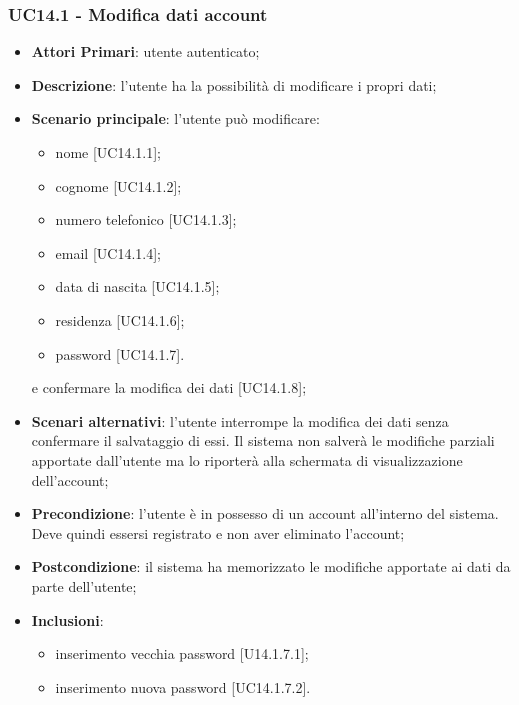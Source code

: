 \subsubsection{UC14.1 - Modifica dati account}
\begin{itemize}
	\item \textbf{Attori Primari}: utente autenticato;
	\item \textbf{Descrizione}: l'utente ha la possibilità di modificare i propri dati;
	\item \textbf{Scenario principale}: l'utente può modificare:
	\begin{itemize}
		\item nome [UC14.1.1];
		\item cognome [UC14.1.2];
		\item numero telefonico [UC14.1.3];
		\item email [UC14.1.4];
		\item data di nascita [UC14.1.5];
		\item residenza [UC14.1.6];
		\item password [UC14.1.7].
	\end{itemize}
	e confermare la modifica dei dati [UC14.1.8];
	\item \textbf{Scenari alternativi}: l'utente interrompe la modifica dei dati senza confermare il salvataggio di essi. Il sistema non salverà le modifiche parziali apportate dall'utente ma lo riporterà alla schermata di visualizzazione dell'account;	 
	\item \textbf{Precondizione}: l'utente è in possesso di un account all'interno del sistema. Deve quindi essersi registrato e non aver eliminato l'account;
	\item \textbf{Postcondizione}: il sistema ha memorizzato le modifiche apportate ai dati da parte dell’utente;
	\item \textbf{Inclusioni}:
	\begin{itemize}
		\item inserimento vecchia password [U14.1.7.1];
		\item inserimento nuova password [UC14.1.7.2].
	\end{itemize}
\end{itemize}
